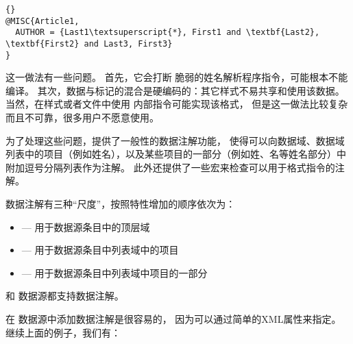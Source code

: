\begin{lstlisting}[style=bibtex]{}
@MISC{Article1,
  AUTHOR = {Last1\textsuperscript{*}, First1 and \textbf{Last2}, \textbf{First2} and Last3, First3}
}
\end{lstlisting}
%
这一做法有一些问题。
首先，它会打断 \BibTeX 脆弱的姓名解析程序指令，可能根本不能编译。
其次，数据与标记的混合是硬编码的：其它样式不易共享和使用该数据。
当然，在样式或者文件中使用 \biblatex 内部指令可能实现该格式，
但是这一做法比较复杂而且不可靠，很多用户不愿意使用。

为了处理这些问题，\biblatex 提供了一般性的数据注解功能，
使得可以向数据域、数据域列表中的项目（例如姓名），以及某些项目的一部分（例如姓、名等姓名部分）中附加逗号分隔列表作为注解。
此外还提供了一些宏来检查可以用于格式指令的注解。

数据注解有三种“尺度”，按照特性增加的顺序依次为：
\begin{itemize}
\item {}---%
用于数据源条目中的顶层域
\item {}---%
用于数据源条目中列表域中的项目
\item {}---%
用于数据源条目中列表域中项目的一部分
\end{itemize}
%
\BibTeX 和 \biblatexml 数据源都支持数据注解。

在 \biblatexml 数据源中添加数据注解是很容易的，
因为可以通过简单的XML属性来指定。
继续上面的例子，我们有：

